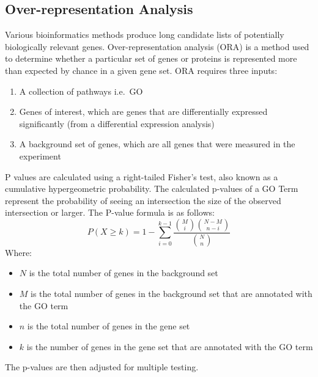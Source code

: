\documentclass{article}
\begin{document}
    \subsection{Over-representation Analysis}\label{subsec:over-representation-analysis}
    Various bioinformatics methods produce long candidate lists of potentially biologically relevant genes. Over-representation analysis (ORA) is a method used to determine whether a particular set of genes or proteins is represented more than expected by chance in a given gene set\cite{ora-explanation}. ORA requires three inputs:
    \begin{enumerate}
        \item A collection of pathways i.e.\ GO
        \item Genes of interest, which are genes that are differentially expressed significantly (from a differential expression analysis)
        \item A background set of genes, which are all genes that were measured in the experiment
    \end{enumerate}
    P values are calculated using a right-tailed Fisher's test, also known as a cumulative hypergeometric probability. The calculated p-values of a GO Term represent the probability of seeing an intersection the size of the observed intersection or larger\cite{g:profiler-docs}. The P-value formula is as follows:
    \[
        P(X\geq k) =  1-\sum^{k-1}_{i=0}\frac{\binom{M}{i}\binom{N-M}{n-i}}{\binom{N}{n}}
    \]
    Where:
    \begin{itemize}
        \item $N$ is the total number of genes in the background set
        \item $M$ is the total number of genes in the background set that are annotated with the GO term
        \item $n$ is the total number of genes in the gene set
        \item $k$ is the number of genes in the gene set that are annotated with the GO term
    \end{itemize} \cite{ora-explanation}
    The p-values are then adjusted for multiple testing.
\end{document}
